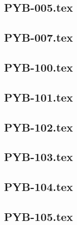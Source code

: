 \renewcommand{\xxexo}{PYB-005.tex} 
\subsection*{\xxexo} 
\graphicspath{{../../exos/python_bases/PYB-005/}}
 
 
\renewcommand{\xxexo}{PYB-007.tex} 
\subsection*{\xxexo} 
\graphicspath{{../../exos/python_bases/PYB-007/}}
 
 
\renewcommand{\xxexo}{PYB-100.tex} 
\subsection*{\xxexo} 
\graphicspath{{../../exos/python_bases/PYB-100/}}
 
 
\renewcommand{\xxexo}{PYB-101.tex} 
\subsection*{\xxexo} 
\graphicspath{{../../exos/python_bases/PYB-101/}}
 
 
\renewcommand{\xxexo}{PYB-102.tex} 
\subsection*{\xxexo} 
\graphicspath{{../../exos/python_bases/PYB-102/}}
 
 
\renewcommand{\xxexo}{PYB-103.tex} 
\subsection*{\xxexo} 
\graphicspath{{../../exos/python_bases/PYB-103/}}
 
 
\renewcommand{\xxexo}{PYB-104.tex} 
\subsection*{\xxexo} 
\graphicspath{{../../exos/python_bases/PYB-104/}}
 
 
\renewcommand{\xxexo}{PYB-105.tex} 
\subsection*{\xxexo} 
\graphicspath{{../../exos/python_bases/PYB-105/}}
 
 
